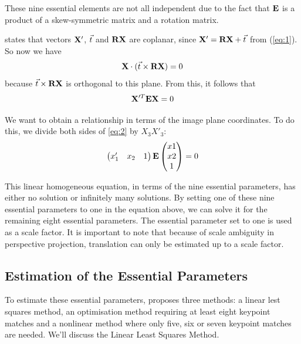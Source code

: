 These nine essential elements are not all independent due to the fact that  $\mathbf{E}$ is a product of a skew-symmetric matrix and a rotation matrix.\bigskip

\cite{tekalp} states that vectors $\mathbf{X}'$, $\vec t$ and $\mathbf{R}\mathbf{X}$ are coplanar, since $\mathbf{X}' = \mathbf{R}\mathbf{X} + \vec t$ from (\ref{eq:1}). So now we have 
\begin{equation}
    \mathbf{X} \cdot (\vec t \times \mathbf{R}\mathbf{X}) = 0
\end{equation}
because $\vec t \times \mathbf{R}\mathbf{X}$ is orthogonal to this plane. From this, it follows that 
\begin{equation} \label{eq:2}
    \mathbf{X}'^T\mathbf{E}\mathbf{X} = 0
\end{equation}

We want to obtain a relationship in terms of the image plane coordinates. To do this, we divide both sides of \ref{eq:2} by $X_3 X'_3$:
\begin{equation} \label{eq:essential}
    \begin{pmatrix}
        x_1'&x_2&1
    \end{pmatrix}
    \mathbf{E}
    \begin{pmatrix}
        x1 \\
        x2 \\
        1
    \end{pmatrix}
    = 0
\end{equation}

This linear homogeneous equation, in terms of the nine essential parameters, has either no solution or infinitely many solutions. By setting one of these nine essential parameters to one in the equation above, we can solve it for the remaining eight essential parameters. The essential parameter set to one is used as a scale factor. It is important to note that because of scale ambiguity in perspective projection, translation can only be estimated up to a scale factor.

\subsection{Estimation of the Essential Parameters}
To estimate these essential parameters, \cite{tekalp} proposes three methods: a linear lest squares method, an optimisation method requiring at least eight keypoint matches and a nonlinear method where only five, six or seven keypoint matches are needed. We'll discuss the Linear Least Squares Method.\bigskip

